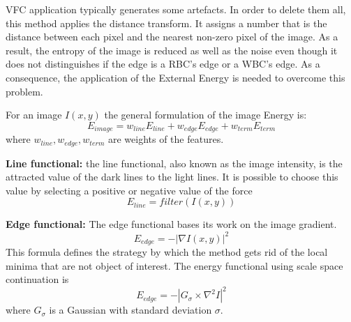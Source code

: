 \documentclass[final,a4paper,12pt,english]{UnicaPhdThesis3}
\begin{document}
VFC application typically generates some artefacts. In order to delete them all, this method applies the distance transform. It assigns a number that is the distance between each pixel and the nearest non-zero pixel of the image. As a result, the entropy of the image is reduced as well as the noise even though it does not distinguishes if the edge is a RBC's edge or a WBC's edge. As a consequence, the application of the External Energy is needed to overcome this problem.

For an image $I(x,y)$ the general formulation of the image Energy is:
\begin{equation}
E_{image}=w_{line}E_{line} + w_{edge}E_{edge} + w_{term}E_{term}
\end{equation}
where $w_{line}, w_{edge}, w_{term}$ are weights of the features.

\textbf{Line functional:} the line functional, also known as the image intensity, is the attracted value of the dark lines to the light lines. It is possible to choose this value by selecting a positive or negative value of the force
\begin{equation}
E_{{line}}=filter(I(x,y))
\end{equation}

\textbf{Edge functional:} The edge functional bases its work on the image gradient.
\begin{equation}
E_{{edge}}=-\left|\nabla I(x,y)\right\vert ^{2}
\end{equation}
This formula defines the strategy by which the method gets rid of the local minima that are not object of interest. The energy functional using scale space continuation is
\begin{equation}
E_{edge}=-\left|G_{\sigma }\times\nabla ^{2}I\right\vert ^{2}
\end{equation}
where $ G_{\sigma } $ is a Gaussian with standard deviation $ \sigma $.
\end{document}
